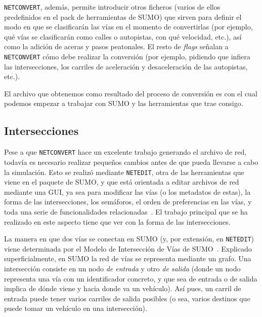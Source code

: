 

\texttt{NETCONVERT}, además, permite introducir otros ficheros (varios de ellos predefinidos en el pack de herramientas de SUMO) que sirven para definir el modo en que se clasificarán las vías en el momento de convertirlas (por ejemplo, qué vías se clasificarán como calles o autopistas, con qué velocidad, etc.), así como la adición de aceras y pasos peatonales. El resto de \textit{flags} señalan a \texttt{NETCONVERT} cómo debe realizar la conversión (por ejemplo, pidiendo que infiera las intersecciones, los carriles de aceleración y desaceleración de las autopistas, etc.).

El archivo que obtenemos como resultado del proceso de conversión es con el cual podemos empezar a trabajar con SUMO y las herramientas que trae consigo.

\subsection{Intersecciones}

Pese a que \texttt{NETCONVERT} hace un excelente trabajo generando el archivo de red, todavía es necesario realizar pequeños cambios antes de que pueda llevarse a cabo la simulación. Esto se realizó mediante \texttt{NETEDIT}, otra de las herramientas que viene en el paquete de SUMO, y que está orientada a editar archivos de red mediante una GUI, ya sea para modificar las vías (o los metadatos de estas), la forma de las intersecciones, los semáforos, el orden de preferencias en las vías, y toda una serie de funcionalidades relacionadas~\cite{noauthor_netedit_nodate}. El trabajo principal que se ha realizado en este aspecto tiene que ver con la forma de las intersecciones. 

La manera en que dos vías se conectan en SUMO (y, por extensión, en \texttt{NETEDIT}) viene determinada por el Modelo de Intersección de Vías de SUMO~\cite{erdmann_sumos_2014}. Explicado superficialmente, en SUMO la red de vías se representa mediante un grafo. Una intersección consiste en un nodo \textit{de entrada} y otro \textit{de salida} (donde un nodo representa una vía con un identificador concreto, y que sea de entrada o de salida implica de dónde viene y hacia donde va un vehículo). Así pues, un carril de entrada puede tener varios carriles de salida posibles (o sea, varios destinos que puede tomar un vehículo en una intersección).

